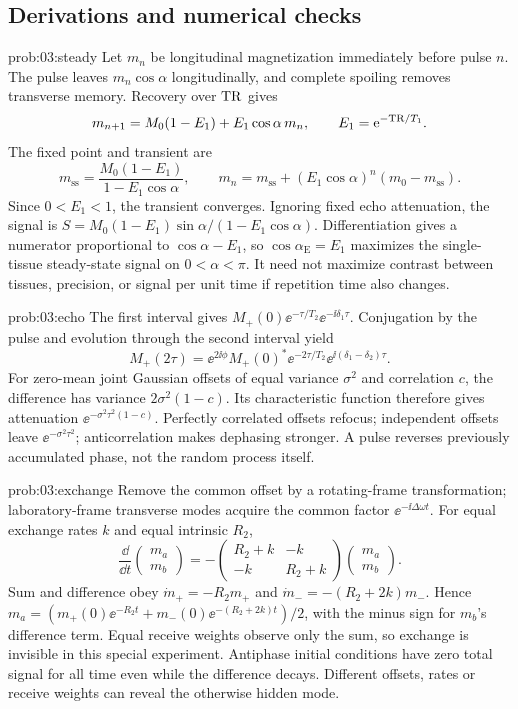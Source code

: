 \subsection{Derivations and numerical checks}
\begin{solution}{prob:03:steady}
Let \(m_n\) be longitudinal magnetization immediately before pulse \(n\).
The pulse leaves \(m_n\cos\alpha\) longitudinally, and complete spoiling removes transverse memory. Recovery over \(\mathrm{TR}\) gives
\[
 m_{n+1}=M_0(1-E_1)+E_1\cos\alpha\,m_n,\qquad E_1=\mathrm{e}^{-\mathrm{TR}/T_1}.
\]
The fixed point and transient are
\[
 m_{\mathrm{ss}}=\frac{M_0(1-E_1)}{1-E_1\cos\alpha},\qquad
 m_n=m_{\mathrm{ss}}+(E_1\cos\alpha)^n(m_0-m_{\mathrm{ss}}).
\]
Since \(0<E_1<1\), the transient converges. Ignoring fixed echo attenuation, the signal is
\(S=M_0(1-E_1)\sin\alpha/(1-E_1\cos\alpha)\).
Differentiation gives a numerator proportional to \(\cos\alpha-E_1\), so
\(\cos\alpha_{\mathrm E}=E_1\) maximizes the single-tissue steady-state signal on \(0<\alpha<\pi\).
It need not maximize contrast between tissues, precision, or signal per unit time if repetition time also changes.
\end{solution}
\begin{solution}{prob:03:echo}
The first interval gives \(M_+(0)\ee^{-\tau/T_2}\ee^{-\ii\delta_1\tau}\).
Conjugation by the pulse and evolution through the second interval yield
\[
 M_+(2\tau)=\ee^{2\ii\phi}M_+(0)^*
 \ee^{-2\tau/T_2}\ee^{\ii(\delta_1-\delta_2)\tau}.
\]
For zero-mean joint Gaussian offsets of equal variance \(\sigma^2\) and correlation \(c\), the difference has variance \(2\sigma^2(1-c)\). Its characteristic function therefore gives attenuation
\(\ee^{-\sigma^2\tau^2(1-c)}\).
Perfectly correlated offsets refocus; independent offsets leave
\(\ee^{-\sigma^2\tau^2}\); anticorrelation makes dephasing stronger. A pulse reverses previously accumulated phase, not the random process itself.
\end{solution}
\begin{solution}{prob:03:exchange}
Remove the common offset by a rotating-frame transformation; laboratory-frame transverse modes acquire the common factor \(\ee^{-\ii\Delta\omega t}\).
For equal exchange rates \(k\) and equal intrinsic \(R_2\),
\[
 \frac{\dd}{\dd t}\begin{pmatrix}m_a\\m_b\end{pmatrix}
 =-\begin{pmatrix}R_2+k&-k\\-k&R_2+k\end{pmatrix}
 \begin{pmatrix}m_a\\m_b\end{pmatrix}.
\]
Sum and difference obey
\(\dot m_+=-R_2m_+\) and
\(\dot m_-=-(R_2+2k)m_-\).
Hence \(m_a=(m_+(0)\ee^{-R_2t}+m_-(0)\ee^{-(R_2+2k)t})/2\), with the minus sign for \(m_b\)'s difference term.
Equal receive weights observe only the sum, so exchange is invisible in this special experiment. Antiphase initial conditions have zero total signal for all time even while the difference decays. Different offsets, rates or receive weights can reveal the otherwise hidden mode.
\end{solution}
